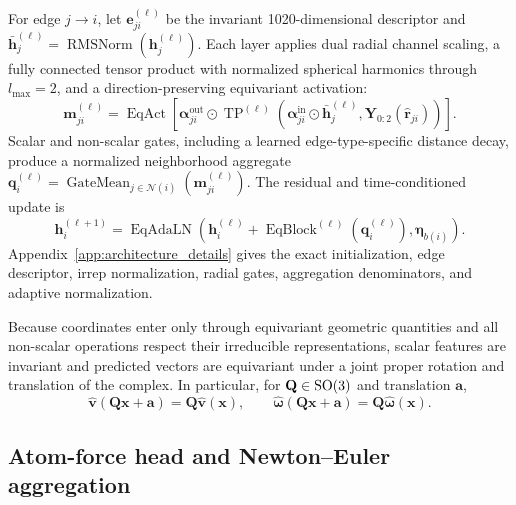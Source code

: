 For edge \(j\rightarrow i\), let \(\mathbf{e}_{ji}^{(\ell)}\) be the invariant
1020-dimensional descriptor and
\(\bar{\mathbf{h}}_j^{(\ell)}
=\operatorname{RMSNorm}(\mathbf{h}_j^{(\ell)})\). Each layer applies
dual radial channel scaling, a fully connected tensor product with normalized
spherical harmonics through \(l_{\max}=2\), and a direction-preserving
equivariant activation:
\begin{equation}
    \mathbf{m}_{ji}^{(\ell)}
    =
    \operatorname{EqAct}
    \left[
      \boldsymbol{\alpha}_{ji}^{\mathrm{out}}
      \odot
      \operatorname{TP}^{(\ell)}
      \left(
        \boldsymbol{\alpha}_{ji}^{\mathrm{in}}
        \odot\bar{\mathbf{h}}_j^{(\ell)},
        \mathbf{Y}_{0:2}(\widehat{\mathbf{r}}_{ji})
      \right)
    \right].
    \label{eq:tp_message}
\end{equation}
Scalar and non-scalar gates, including a learned edge-type-specific distance
decay, produce a normalized neighborhood aggregate
\(\mathbf{q}_i^{(\ell)}
=\operatorname{GateMean}_{j\in\mathcal{N}(i)}
(\mathbf{m}_{ji}^{(\ell)})\). The residual and time-conditioned update is
\begin{equation}
    \mathbf{h}_i^{(\ell+1)}
    =
    \operatorname{EqAdaLN}
    \left(
      \mathbf{h}_i^{(\ell)}
      +
      \operatorname{EqBlock}^{(\ell)}
      (\mathbf{q}_i^{(\ell)}),
      \boldsymbol{\eta}_{b(i)}
    \right).
    \label{eq:compact_layer_update}
\end{equation}
Appendix~\ref{app:architecture_details} gives the exact initialization, edge
descriptor, irrep normalization, radial gates, aggregation denominators, and
adaptive normalization.

Because coordinates enter only through equivariant geometric quantities and
all non-scalar operations respect their irreducible representations, scalar
features are invariant and predicted vectors are equivariant under a joint
proper rotation and translation of the complex. In particular, for
\(\mathbf{Q}\in\mathrm{SO}(3)\) and translation \(\mathbf{a}\),
\[
    \widehat{\mathbf{v}}(\mathbf{Q}\mathbf{x}+\mathbf{a})
    =
    \mathbf{Q}\widehat{\mathbf{v}}(\mathbf{x}),
    \qquad
    \widehat{\boldsymbol{\omega}}
    (\mathbf{Q}\mathbf{x}+\mathbf{a})
    =
    \mathbf{Q}\widehat{\boldsymbol{\omega}}(\mathbf{x}).
\]

\subsection{Atom-force head and Newton--Euler aggregation}
\label{sec:newton_euler}

